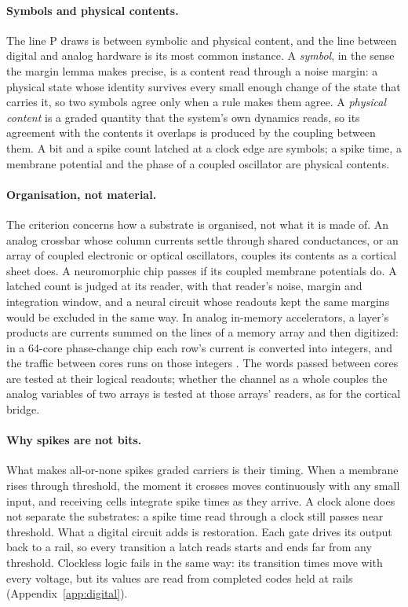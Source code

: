 \documentclass[12pt]{article}
\begin{document}
\paragraph{Symbols and physical contents.} The line P draws is between symbolic
and physical content, and the line between digital and analog hardware is its
most common instance. A \emph{symbol}, in the sense the margin lemma makes
precise, is a content read through a noise margin: a physical state whose
identity survives every small enough change of the state that carries it, so two
symbols agree only when a rule makes them agree. A \emph{physical content} is a
graded quantity that the system's own dynamics reads, so its agreement with the
contents it overlaps is produced by the coupling between them. A bit and a spike
count latched at a clock edge are symbols; a spike time, a membrane potential
and the phase of a coupled oscillator are physical contents.

\paragraph{Organisation, not material.} The criterion concerns how a substrate is
organised, not what it is made of. An analog crossbar whose column currents
settle through shared conductances, or an array of coupled electronic or optical
oscillators, couples its contents as a cortical sheet does. A neuromorphic chip
passes if its coupled membrane potentials do. A latched count is judged at its
reader, with that reader's noise, margin and integration window, and a neural
circuit whose readouts kept the same margins would be excluded in the same way.
In analog in-memory accelerators, a layer's
products are currents summed on the lines of a memory array and then digitized:
in a 64-core phase-change chip each row's current is converted into integers,
and the traffic between cores runs on those integers \citep{legallo2023}. The
words passed between cores are tested at their logical readouts; whether the
channel as a whole couples the analog variables of two arrays is tested at
those arrays' readers, as for the cortical bridge.

\paragraph{Why spikes are not bits.} What makes all-or-none spikes graded
carriers is their timing. When a membrane rises through threshold, the moment it
crosses moves continuously with any small input, and receiving cells integrate
spike times as they arrive. A clock alone does not separate the substrates: a
spike time read through a clock still passes near threshold. What a digital
circuit adds is restoration. Each gate drives its output back to a rail, so every
transition a latch reads starts and ends far from any threshold. Clockless logic
fails in the same way: its transition times move with every voltage, but its
values are read from completed codes held at rails (Appendix~\ref{app:digital}).
\end{document}
